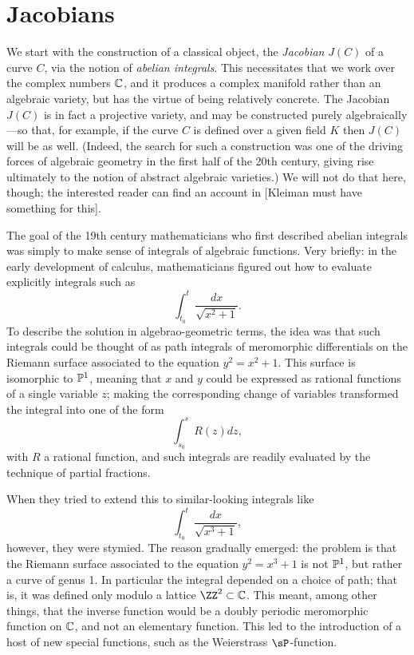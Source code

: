 

\section{Jacobians}

We start with the construction of a classical object, the \emph{Jacobian} $J(C)$ of a curve $C$, via the notion of \emph{abelian integrals}. This necessitates that we work over the complex numbers $\CC$, and it produces a complex manifold rather than an algebraic variety, but has the virtue of being relatively concrete. The Jacobian $J(C)$ is in fact a projective variety, and may be constructed purely algebraically---so that, for example, if the curve $C$ is defined over a given field $K$ then $J(C)$ will be as well. (Indeed, the search for such a construction was one of the driving forces of algebraic geometry in the first half of the 20th century, giving rise ultimately to the notion of abstract algebraic varieties.) We will not do that here, though; the interested reader can find an account in \cite{??s} [Kleiman must have something for this].

The goal of the 19th century mathematicians who first described abelian integrals was simply to make sense of integrals of algebraic functions. Very briefly: in the early development of calculus, mathematicians figured out how to evaluate explicitly integrals such as
$$
\int_{t_0}^t \frac{dx}{\sqrt{x^2+1}}.
$$
To describe the solution in algebrao-geometric terms, the idea was that such integrals could be thought of as path integrals of meromorphic differentials on the Riemann surface associated to the equation $y^2 = x^2+1$. This surface is isomorphic to $\PP^1$, meaning that $x$ and $y$ could be expressed as rational functions of a single variable $z$; making the corresponding change of variables transformed the integral into one of the form
$$
\int_{s_0}^s R(z)dz,
$$
with $R$ a rational function, and such integrals are readily evaluated by the technique of partial fractions.

When they tried to extend this to similar-looking integrals like
$$
\int_{t_0}^t \frac{dx}{\sqrt{x^3+1}},
$$
however, they were stymied. The reason gradually emerged: the problem is that the Riemann surface associated to the equation $y^2 = x^3+1$ is not $\PP^1$, but rather a curve of genus 1. In particular  the integral depended on a choice of path; that is, it was defined only modulo a lattice $\ZZ^2 \subset \CC$. This meant, among other things, that the inverse function would be a doubly periodic meromorphic function on $\CC$, and not an elementary function. This led to the introduction of a host of new special functions, such as the Weierstrass $\sP$-function.

